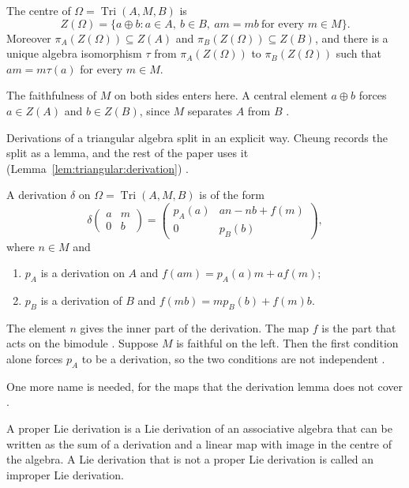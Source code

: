\begin{proposition}\label{prop:triangular:centre}
The centre of $\Omega=\operatorname{Tri}(A,M,B)$ is
\[
Z(\Omega)=\{a\oplus b : a\in A,\ b\in B,\ am=mb\ \text{for every } m\in M\}.
\]
Moreover $\pi_A(Z(\Omega))\subseteq Z(A)$ and $\pi_B(Z(\Omega))\subseteq Z(B)$,
and there is a unique algebra isomorphism $\tau$ from $\pi_A(Z(\Omega))$ to
$\pi_B(Z(\Omega))$ such that $am=m\tau(a)$ for every $m\in M$.
\end{proposition}

The faithfulness of $M$ on both sides enters here. A central element $a\oplus b$
forces $a\in Z(A)$ and $b\in Z(B)$, since $M$ separates $A$ from $B$
\cite[p.~119]{Cheung2001}.

Derivations of a triangular algebra split in an explicit way. Cheung records the
split as a lemma, and the rest of the paper uses it (Lemma~\ref{lem:triangular:derivation})
\cite[Lemma~5, p.~303]{Cheung2003}.\begin{lemma}\label{lem:triangular:derivation}
A derivation $\delta$ on $\Omega=\operatorname{Tri}(A,M,B)$ is of the form
\[
\delta\begin{pmatrix} a & m\\ 0 & b\end{pmatrix}
=\begin{pmatrix} p_A(a) & an-nb+f(m)\\ 0 & p_B(b)\end{pmatrix},
\]
where $n\in M$ and
\begin{enumerate}
\item $p_A$ is a derivation on $A$ and $f(am)=p_A(a)m+af(m)$;
\item $p_B$ is a derivation of $B$ and $f(mb)=mp_B(b)+f(m)b$.
\end{enumerate}
\end{lemma}

The element $n$ gives the inner part of the derivation. The map $f$ is the part
that acts on the bimodule \cite[p.~303]{Cheung2003}. Suppose $M$ is faithful on
the left. Then the first condition alone forces $p_A$ to be a derivation, so the
two conditions are not independent \cite[p.~303]{Cheung2003}.

One more name is needed, for the maps that the derivation lemma does not cover
\cite[p.~299]{Cheung2003}.

\begin{definition}\label{def:triangular:proper-lie}
A proper Lie derivation is a Lie derivation of an associative algebra that can be
written as the sum of a derivation and a linear map with image in the centre of the
algebra. A Lie derivation that is not a proper Lie derivation is called an improper
Lie derivation.
\end{definition}

